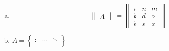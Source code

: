 \documentclass[a4paper, 11pt]{article}
\begin{document}
\begin{enumerate}[a.]
	\item \[ 
		\begin{Vmatrix} A \end{Vmatrix} = \begin{Vmatrix}
											t & n & m \\
											b & d & o \\
											b & s & x
										\end{Vmatrix}
			\]

	\item $ 
		A = \begin{Bmatrix}
			\vdots & \ldots & \ddots\\
		\end{Bmatrix} 
		$
\end{enumerate}
\end{document}
